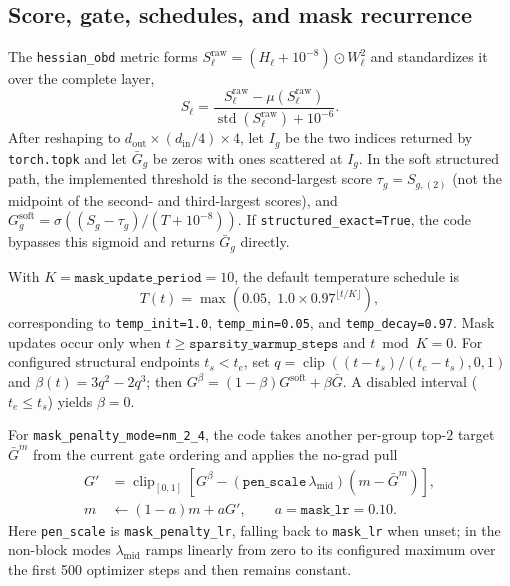 \documentclass{article}
\begin{document}
\subsection{Score, gate, schedules, and mask recurrence}
The \texttt{hessian\_obd} metric forms
$S^{\mathrm{raw}}_\ell=(H_\ell+10^{-8})\odot W_\ell^2$ and standardizes it
over the complete layer,
\begin{equation}
S_\ell=\frac{S^{\mathrm{raw}}_\ell-\mu(S^{\mathrm{raw}}_\ell)}
 {\operatorname{std}(S^{\mathrm{raw}}_\ell)+10^{-6}}.
\end{equation}
After reshaping to
$d_{\mathrm{out}}\times(d_{\mathrm{in}}/4)\times4$, let $I_g$ be the two
indices returned by \texttt{torch.topk} and let $\bar G_g$ be zeros with ones
scattered at $I_g$. In the soft structured path, the implemented threshold is
the second-largest score $\tau_g=S_{g,(2)}$ (not the midpoint of the second-
and third-largest scores), and
$G^{\mathrm{soft}}_g=\sigma((S_g-\tau_g)/(T+10^{-8}))$.
If \texttt{structured\_exact=True}, the code bypasses this sigmoid and returns
$\bar G_g$ directly.

With $K=\texttt{mask\_update\_period}=10$, the default temperature schedule is
\begin{equation}
T(t)=\max\!\left(0.05,\;1.0\times0.97^{\lfloor t/K\rfloor}\right),
\end{equation}
corresponding to \texttt{temp\_init=1.0}, \texttt{temp\_min=0.05}, and
\texttt{temp\_decay=0.97}. Mask updates occur only when
$t\ge\texttt{sparsity\_warmup\_steps}$ and $t\bmod K=0$. For configured
structural endpoints $t_s<t_e$, set
$q=\operatorname{clip}((t-t_s)/(t_e-t_s),0,1)$ and
$\beta(t)=3q^2-2q^3$; then
$G^\beta=(1-\beta)G^{\mathrm{soft}}+\beta\bar G$. A disabled interval
($t_e\le t_s$) yields $\beta=0$.

For \texttt{mask\_penalty\_mode=nm\_2\_4}, the code takes another per-group
top-$2$ target $\bar G^{m}$ from the current gate ordering and applies the
no-grad pull
\begin{equation}
\begin{aligned}
G' & = \operatorname{clip}_{[0,1]}\!\left[
G^\beta-(\texttt{pen\_scale}\,\lambda_{\mathrm{mid}})
(m-\bar G^{m})\right],\\
m & \leftarrow(1-a)m+aG',\qquad a=\texttt{mask\_lr}=0.10.
\end{aligned}
\end{equation}
Here \texttt{pen\_scale} is \texttt{mask\_penalty\_lr}, falling back to
\texttt{mask\_lr} when unset; in the non-block modes
$\lambda_{\mathrm{mid}}$ ramps linearly from zero to its configured maximum
over the first 500 optimizer steps and then remains constant.
\end{document}

